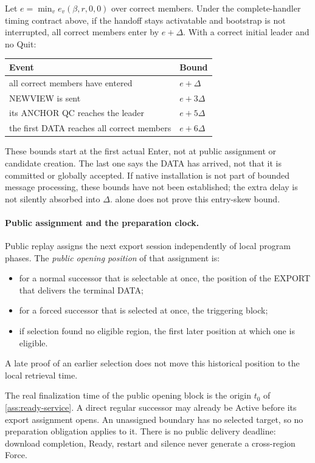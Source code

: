 \documentclass[11pt,a4paper]{article}
\begin{document}
Let $e=\min_v e_v(\beta,r,0,0)$ over correct members. Under the
complete-handler timing contract above, if the handoff stays activatable
and bootstrap is not interrupted, all correct members enter by $e+\Delta$.
With a correct initial leader and no Quit:
\begin{center}\small
\begin{tabular}{@{}ll@{}}\toprule
Event & Bound\\\midrule
all correct members have entered & $e+\Delta$\\
NEWVIEW is sent & $e+3\Delta$\\
its ANCHOR QC reaches the leader & $e+5\Delta$\\
the first DATA reaches all correct members & $e+6\Delta$\\\bottomrule
\end{tabular}
\end{center}
These bounds start at the first actual Enter, not at public assignment or
candidate creation. The last one says the DATA has arrived, not that it
is committed or globally accepted. If native installation is not part of
bounded message processing, these bounds have not been established; the
extra delay is not silently absorbed into $\Delta$. 
alone does not prove this entry-skew bound.

\paragraph{Public assignment and the preparation clock.}
Public replay assigns the next export session independently of local
program phases. The \emph{public opening position} of that assignment is:
\begin{itemize}
\item for a normal successor that is selectable at once, the position of
the EXPORT that delivers the terminal DATA;
\item for a forced successor that is selected at once, the triggering
block;
\item if selection found no eligible region, the first later position at
which one is eligible.
\end{itemize}
A late proof of an earlier selection does not move this historical
position to the local retrieval time.

The real finalization time of the public opening block is the origin
$t_0$ of \cref{ass:ready-service}. A direct regular successor may already
be Active before its export assignment opens. An unassigned boundary has
no selected target, so no preparation obligation applies to it. There is
no public delivery deadline: download completion, Ready, restart and
silence never generate a cross-region Force.
\end{document}
